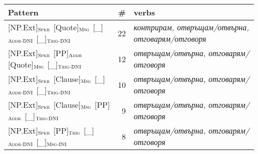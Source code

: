 \documentclass[output=paper,colorlinks,citecolor=brown]{langscibook}
\begin{document}
\begin{table}
    \centering\footnotesize
    \begin{tabularx}{\textwidth}{ lrQ }
\lsptoprule
         Pattern  & \#  & verbs \\
\midrule
{[NP.Ext]}$_{\text{\textsc{Spkr}}}$ {[Quote]}$_{\text{\textsc{Msg}}}$ {[\_]}$_{\text{\textsc{Addr-DNI}}}$ {[\_]}$_{\text{\textsc{Trig-DNI}}}$ & 22 & \textit{контрирам, отвръщам\slash отвърна, отговарям\slash отговоря}\\

{[NP.Ext]}$_{\text{\textsc{Spkr}}}$ {[PP]}$_{\text{\textsc{Addr}}}$ {[Quote]}$_{\text{\textsc{Msg}}}$ {[\_]}$_{\text{\textsc{Trig-DNI}}}$ & 12 & \textit{отвръщам\slash отвърна, отговарям\slash отговоря}\\

{[NP.Ext]}$_{\text{\textsc{Spkr}}}$ {[Clause]}$_{\text{\textsc{Msg}}}$ {[\_]}$_{\text{\textsc{Addr-DNI}}}$ {[\_]}$_{\text{\textsc{Trig-DNI}}}$ & 10 & \textit{отвръщам\slash отвърна, отговарям\slash отговоря}\\

{[NP.Ext]}$_{\text{\textsc{Spkr}}}$ {[Clause]}$_{\text{\textsc{Msg}}}$ {[PP]}$_{\text{\textsc{Addr}}}$ {[\_]}$_{\text{\textsc{Trig-DNI}}}$ & 9 & \textit{отвръщам\slash отвърна, отговарям\slash отговоря}\\

{[NP.Ext]}$_{\text{\textsc{Spkr}}}$ {[PP]}$_{\text{\textsc{Trig}}}$ {[\_]}$_{\text{\textsc{Addr-DNI}}}$   {[\_]}$_{\text{\textsc{Msg-INI}}}$ & 8 & \textit{отвръщам\slash отвърна, отговарям\slash отговоря}\\






\end{tabularx}
\end{table}
\end{document}
